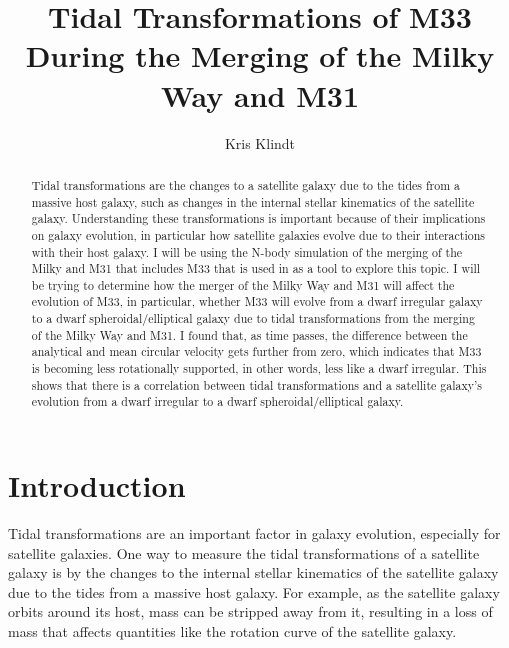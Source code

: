 \documentclass[trackchanges, twocolumn]{aastex7}
\begin{document}
\title{Tidal Transformations of M33 During the Merging of the Milky Way and M31}

\author{Kris Klindt}

\begin{abstract}
    Tidal transformations are the changes to a satellite galaxy due to the tides from a massive host galaxy, such as changes in the internal stellar kinematics of the satellite galaxy. Understanding these transformations is important because of their implications on galaxy evolution, in particular how satellite galaxies evolve due to their interactions with their host galaxy. I will be using the N-body simulation of the merging of the Milky and M31 that includes M33 that is used in \cite{MarelBesla2012} as a tool to explore this topic. I will be trying to determine how the merger of the Milky Way and M31 will affect the evolution of M33, in particular, whether M33 will evolve from a dwarf irregular galaxy to a dwarf spheroidal/elliptical galaxy due to tidal transformations from the merging of the Milky Way and M31. I found that, as time passes, the difference between the analytical and mean circular velocity gets further from zero, which indicates that M33 is becoming less rotationally supported, in other words, less like a dwarf irregular. This shows that there is a correlation between tidal transformations and a satellite galaxy's evolution from a dwarf irregular to a dwarf spheroidal/elliptical galaxy.
\end{abstract}


\section{Introduction} 

Tidal transformations are an important factor in galaxy evolution, especially for satellite galaxies. One way to measure the tidal transformations of a satellite galaxy is by the changes to the internal stellar kinematics of the satellite galaxy due to the tides from a massive host galaxy. For example, as the satellite galaxy orbits around its host, mass can be stripped away from it, resulting in a loss of mass that affects quantities like the rotation curve of the satellite galaxy. 
\end{document}
